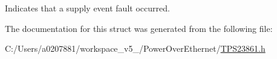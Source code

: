Indicates that a supply event fault occurred. 



The documentation for this struct was generated from the following file\-:\begin{DoxyCompactItemize}
\item 
C\-:/\-Users/a0207881/workspace\-\_\-v5\-\_/\-Power\-Over\-Ethernet/\hyperlink{_t_p_s23861_8h}{T\-P\-S23861.\-h}\end{DoxyCompactItemize}
